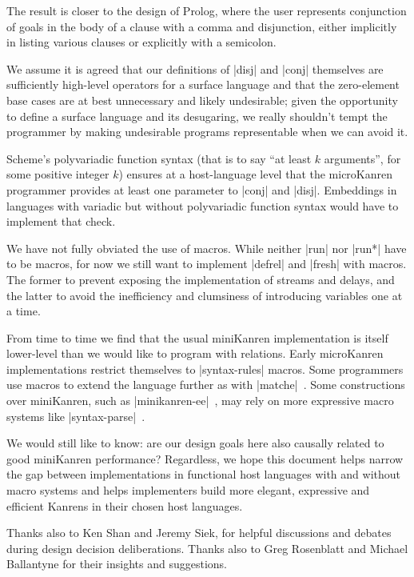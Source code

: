 \documentclass[sigplan,draft,natbib=false]{acmart}
\begin{document}
The result is closer to the design of Prolog, where the user
represents conjunction of goals in the body of a clause with a comma
and disjunction, either implicitly in listing various clauses or
explicitly with a semicolon.

We assume it is agreed that our definitions of \rackinline|disj| and
\rackinline|conj| themselves are sufficiently high-level operators for
a surface language and that the zero-element base cases are at best
unnecessary and likely undesirable; given the opportunity to define a
surface language and its desugaring, we really shouldn't tempt the
programmer by making undesirable programs representable when we can
avoid it.

Scheme's polyvariadic function syntax (that is to say \enquote{at
  least $k$ arguments}, for some positive integer $k$) ensures at a
host-language level that the microKanren programmer provides at least
one parameter to \rackinline|conj| and \rackinline|disj|. Embeddings
in languages with variadic but without polyvariadic function syntax
would have to implement that check.

We have not fully obviated the use of macros. While neither
\rackinline|run| nor \rackinline|run*| have to be macros, for now we
still want to implement \rackinline|defrel| and \rackinline|fresh|
with macros. The former to prevent exposing the implementation of
streams and delays, and the latter to avoid the inefficiency and
clumsiness of introducing variables one at a time.

From time to time we find that the usual miniKanren implementation is
itself lower-level than we would like to program with relations. Early
microKanren implementations restrict themselves to
\rackinline|syntax-rules| macros. Some programmers use macros to
extend the language further as with
\rackinline|matche|~\cite{keep2009pattern}. Some constructions over
miniKanren, such as
\rackinline|minikanren-ee|~\cite{ballantyne2020macros}, may rely on
more expressive macro systems like
\rackinline|syntax-parse|~\cite{culpepper2012fortifying}.

We would still like to know: are our design goals here also causally
related to good miniKanren performance? Regardless, we hope this
document helps narrow the gap between implementations in functional
host languages with and without macro systems and helps implementers
build more elegant, expressive and efficient Kanrens in their chosen
host languages.

\begin{acks}

  Thanks also to Ken Shan and Jeremy Siek, for helpful discussions and
  debates during design decision deliberations. Thanks also to Greg
  Rosenblatt and Michael Ballantyne for their insights and
  suggestions.

\end{acks}

\printbibliography{}
\end{document}
